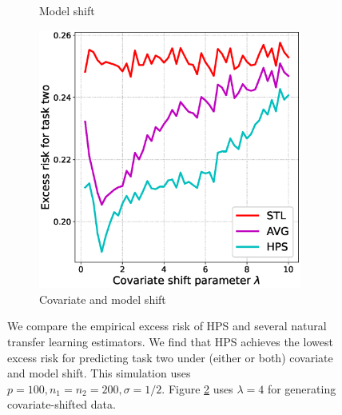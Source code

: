 \begin{figure}[!t]
\begin{subfigure}[b]{0.33\textwidth}
		\caption{Model shift}
		\label{fig_sec5_model}
	\end{subfigure}\hfill%
	\begin{subfigure}[b]{0.33\textwidth}
		\centering
		\includegraphics[width=0.95\textwidth]{figures/compare_risk_cov_model_shift.eps}
		\caption{Covariate and model shift}
		\label{fig_sec5_cov_model}
	\end{subfigure}
	\caption{We compare the empirical excess risk of HPS and several natural transfer learning estimators. We find that HPS achieves the lowest excess risk for predicting task two under (either or both) covariate and model shift. This simulation uses $p = 100, n_1 = n_2 = 200, \sigma = 1/2$. Figure \ref{fig_sec5_cov_model} uses $\lambda = 4$ for generating covariate-shifted data.}
	\label{fig_sec51}
\end{figure}

